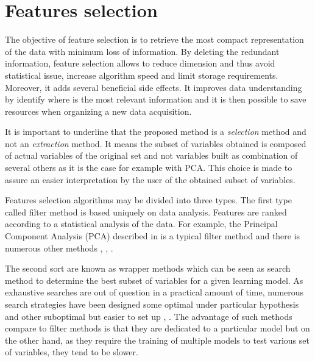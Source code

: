 \documentclass[journal,peerreview,onecolumn]{IEEEtran}
\begin{document}
    \section{Features selection}
    \label{sec:selection}

    The objective of feature selection is to retrieve the most compact
    representation of  the data with  minimum loss of  information. By
    deleting the  redundant information,  feature selection  allows to
    reduce  dimension  and  thus  avoid  statistical  issue,  increase
    algorithm speed and limit  storage requirements. Moreover, it adds
    several beneficial side effects. It improves data understanding by
    identify where  is the  most relevant information  and it  is then
    possible to save resources when organizing a new data
    acquisition.%

    It is important to underline that the proposed method is a \emph{selection} method and not an \emph{extraction} method. It means the subset of variables obtained is composed of actual variables of the original set and not variables built as combination of several others as it is the case for example with PCA. This choice is made to assure an easier interpretation by the user of the obtained subset of variables.

    Features selection algorithms may be divided into three types. The first type called filter method is based uniquely on data analysis. Features are ranked according to a statistical analysis of the data. For example, the Principal Component Analysis (PCA) described in \cite{jimenez1998supervised} is a typical filter method and there is numerous other methods \cite{bruzzone1995extension}, \cite{biesiada2007feature}, \cite{demir2008phase}.

    The second sort are known as wrapper methods which can be seen as search method to determine the best subset of variables for a given learning model. As exhaustive searches are out of question in a practical amount of time, numerous search strategies have been designed some optimal under particular hypothesis \cite{narendra1977branch} and other suboptimal but easier to set up \cite{whitney1971direct}, \cite{somol1999adaptive}. The advantage of such methods compare to filter methods is that they are dedicated to a particular model but on the other hand, as they require the training of multiple models to test various set of variables, they tend to be slower.
\end{document}
